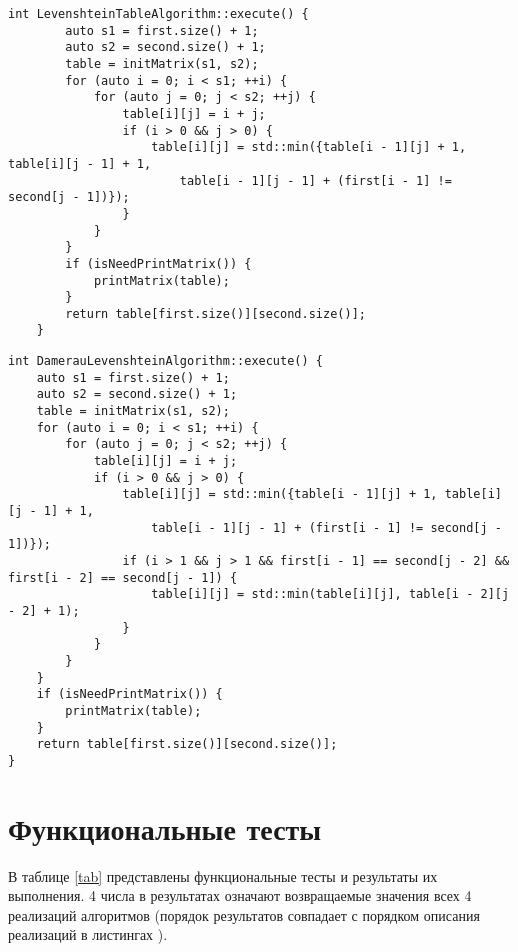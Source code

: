 \begin{lstlisting}[label=lst:levItr,caption=Метод матричного нахождения расстояния Левенштейна]
	int LevenshteinTableAlgorithm::execute() {
		auto s1 = first.size() + 1;
		auto s2 = second.size() + 1;
		table = initMatrix(s1, s2);
		for (auto i = 0; i < s1; ++i) {
			for (auto j = 0; j < s2; ++j) {
				table[i][j] = i + j;
				if (i > 0 && j > 0) {
					table[i][j] = std::min({table[i - 1][j] + 1, table[i][j - 1] + 1, 
						table[i - 1][j - 1] + (first[i - 1] != second[j - 1])});
				}
			}
		}
		if (isNeedPrintMatrix()) {
			printMatrix(table);
		} 
		return table[first.size()][second.size()];
	}
\end{lstlisting}

\begin{lstlisting}[label=lst:damItr,caption=Метод матричного нахождения расстояния Дамерау-Левенштейна]
int DamerauLevenshteinAlgorithm::execute() {
	auto s1 = first.size() + 1;
	auto s2 = second.size() + 1;
	table = initMatrix(s1, s2);
	for (auto i = 0; i < s1; ++i) {
		for (auto j = 0; j < s2; ++j) {
			table[i][j] = i + j;
			if (i > 0 && j > 0) {
				table[i][j] = std::min({table[i - 1][j] + 1, table[i][j - 1] + 1, 
					table[i - 1][j - 1] + (first[i - 1] != second[j - 1])});
				if (i > 1 && j > 1 && first[i - 1] == second[j - 2] && first[i - 2] == second[j - 1]) {
					table[i][j] = std::min(table[i][j], table[i - 2][j - 2] + 1);
				}
			}
		}
	}
	if (isNeedPrintMatrix()) {
		printMatrix(table);
	} 
	return table[first.size()][second.size()];
}
\end{lstlisting}

\section{Функциональные тесты}

В таблице \ref{tab} представлены функциональные тесты и результаты их выполнения. 4 числа в результатах означают возвращаемые значения всех 4 реализаций алгоритмов (порядок результатов совпадает с порядком описания реализаций в листингах ).

